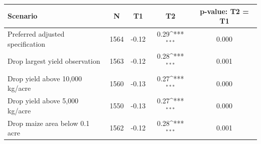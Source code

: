 {
\def\sym#1{\ifmmode^{#1}\else\(^{#1}\)\fi}
\begin{tabular}{lcccc}
\hline\hline
Scenario & N & T1 & T2 & p-value: T2 = T1 \\
\hline
Preferred adjusted specification & 1564 & -0.12 & 0.29\sym{***} & 0.000 \\
Drop largest yield observation & 1563 & -0.12 & 0.28\sym{***} & 0.001 \\
Drop yield above 10,000 kg/acre & 1560 & -0.13 & 0.27\sym{***} & 0.000 \\
Drop yield above 5,000 kg/acre & 1550 & -0.13 & 0.27\sym{***} & 0.000 \\
Drop maize area below 0.1 acre & 1562 & -0.12 & 0.28\sym{***} & 0.001 \\
\hline\hline
\end{tabular}
}
